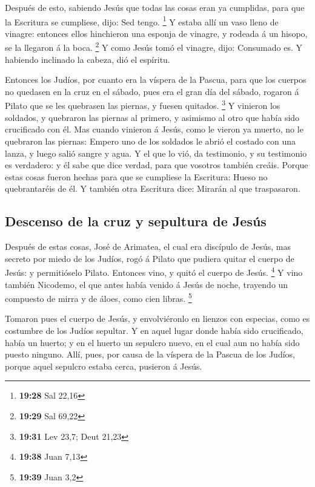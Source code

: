  Después de esto, sabiendo Jesús que todas las cosas eran
ya cumplidas, para que la Escritura se cumpliese, dijo: Sed tengo.
\footnote{\textbf{19:28} Sal 22,16}  Y estaba allí un vaso
lleno de vinagre: entonces ellos hinchieron una esponja de vinagre, y
rodeada á un hisopo, se la llegaron á la boca. \footnote{\textbf{19:29}
  Sal 69,22}  Y como Jesús tomó el vinagre, dijo: Consumado
es. Y habiendo inclinado la cabeza, dió el espíritu.

 Entonces los Judíos, por cuanto era la víspera de la
Pascua, para que los cuerpos no quedasen en la cruz en el sábado, pues
era el gran día del sábado, rogaron á Pilato que se les quebrasen las
piernas, y fuesen quitados. \footnote{\textbf{19:31} Lev 23,7; Deut
  21,23}  Y vinieron los soldados, y quebraron las piernas
al primero, y asimismo al otro que había sido crucificado con él.
 Mas cuando vinieron á Jesús, como le vieron ya muerto, no
le quebraron las piernas:  Empero uno de los soldados le
abrió el costado con una lanza, y luego salió sangre y agua.
 Y el que lo vió, da testimonio, y su testimonio es
verdadero: y él sabe que dice verdad, para que vosotros también creáis.
 Porque estas cosas fueron hechas para que se cumpliese la
Escritura: Hueso no quebrantaréis de él.  Y también otra
Escritura dice: Mirarán al que traspasaron.

\hypertarget{descenso-de-la-cruz-y-sepultura-de-jesuxfas}{%
\subsection{Descenso de la cruz y sepultura de
Jesús}\label{descenso-de-la-cruz-y-sepultura-de-jesuxfas}}

 Después de estas cosas, José de Arimatea, el cual era
discípulo de Jesús, mas secreto por miedo de los Judíos, rogó á Pilato
que pudiera quitar el cuerpo de Jesús: y permitióselo Pilato. Entonces
vino, y quitó el cuerpo de Jesús. \footnote{\textbf{19:38} Juan 7,13}
 Y vino también Nicodemo, el que antes había venido á Jesús
de noche, trayendo un compuesto de mirra y de áloes, como cien libras.
\footnote{\textbf{19:39} Juan 3,2}

 Tomaron pues el cuerpo de Jesús, y envolviéronlo en
lienzos con especias, como es costumbre de los Judíos sepultar.
 Y en aquel lugar donde había sido crucificado, había un
huerto; y en el huerto un sepulcro nuevo, en el cual aun no había sido
puesto ninguno.  Allí, pues, por causa de la víspera de la
Pascua de los Judíos, porque aquel sepulcro estaba cerca, pusieron á
Jesús.

